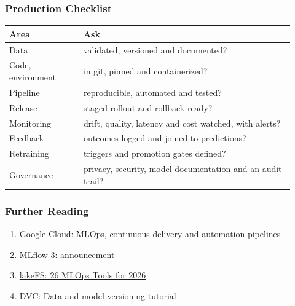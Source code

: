 \begin{frame}[fragile]\frametitle{Production Checklist}
\begin{center}
\small\renewcommand{\arraystretch}{1.35}
\begin{tabular}{>{\raggedright\arraybackslash}p{0.24\linewidth}>{\raggedright\arraybackslash}p{0.68\linewidth}}
\hline
\textbf{Area} & \textbf{Ask} \\
\hline
Data & validated, versioned and documented? \\
Code, environment & in git, pinned and containerized? \\
Pipeline & reproducible, automated and tested? \\
Release & staged rollout and rollback ready? \\
Monitoring & drift, quality, latency and cost watched, with alerts? \\
Feedback & outcomes logged and joined to predictions? \\
Retraining & triggers and promotion gates defined? \\
Governance & privacy, security, model documentation and an audit trail? \\
\hline
\end{tabular}
\end{center}
\end{frame}

\begin{frame}[fragile]\frametitle{Further Reading}
\begin{enumerate}
\item \href{https://docs.cloud.google.com/architecture/mlops-continuous-delivery-and-automation-pipelines-in-machine-learning}{Google Cloud: MLOps, continuous delivery and automation pipelines}
\item \href{https://mlflow.org/blog/mlflow-3-launch/}{MLflow 3: announcement}
\item \href{https://lakefs.io/mlops/mlops-tools/}{lakeFS: 26 MLOps Tools for 2026}
\item \href{https://doc.dvc.org/example-scenarios/versioning-data-and-models/tutorial}{DVC: Data and model versioning tutorial}
\end{enumerate}
\end{frame}
